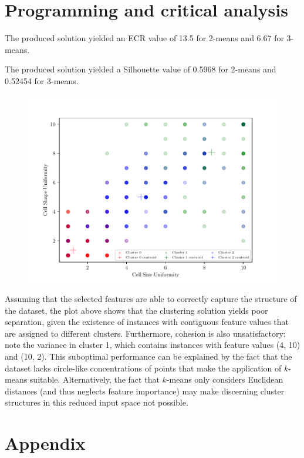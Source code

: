 \documentclass{exam}
\begin{document}
    \section{Programming and critical analysis}
    \begin{questions}
        \setcounter{question}{3}
        \item \quad
        \begin{parts}
            \vspace{-1.6em}
            \item The produced solution yielded an ECR value of 13.5 for 2-means and 6.67 for 3-means.
            \item The produced solution yielded a Silhouette value of 0.5968 for 2-means and 0.52454 for 3-means. 
        \end{parts}
        \item \quad
        \vspace{-1.2em}
        \begin{figure}[H]
            \centering
            \includegraphics{3means.pdf}
        \end{figure}
        \item Assuming that the selected features are able to correctly capture the structure of the dataset, the plot above shows that the clustering solution yields poor separation, given the existence of instances with contiguous feature values that are assigned to different clusters. Furthermore, cohesion is also unsatisfactory: note the variance in cluster 1, which contains instances with feature values (4, 10) and (10, 2). This suboptimal performance can be explained by the fact that the dataset lacks circle-like concentrations of points that make the application of $k$-means suitable. Alternatively, the fact that $k$-means only considers Euclidean distances (and thus neglects feature importance) may make discerning cluster structures in this reduced input space not possible.
    \end{questions}

    \pagebreak
    \section{Appendix}
    \inputminted{python}{src/part02.py}
   
    
    
\end{document}
